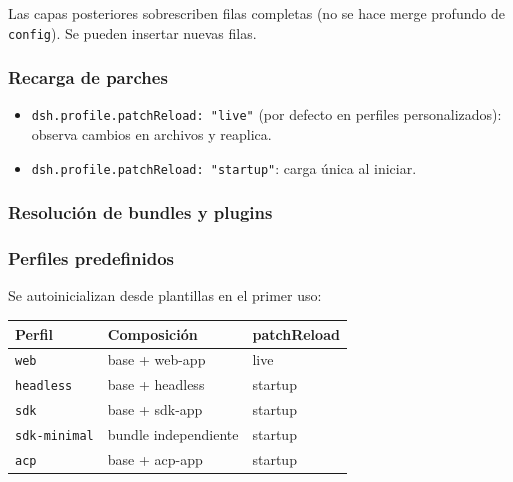 \documentclass[11pt,a4paper]{article}
\begin{document}
Las capas posteriores sobrescriben filas completas (no se hace merge profundo de \texttt{config}). Se pueden insertar nuevas filas.


\subsubsection*{Recarga de parches}


\begin{itemize}[leftmargin=*,topsep=2pt,itemsep=1pt]
  \item \texttt{dsh.profile.patchReload: "live"} (por defecto en perfiles personalizados): observa cambios en archivos y reaplica.
  \item \texttt{dsh.profile.patchReload: "startup"}: carga única al iniciar.
\end{itemize}


\subsubsection*{Resolución de bundles y plugins}




\subsubsection*{Perfiles predefinidos}


Se autoinicializan desde plantillas en el primer uso:


\begin{center}
\begin{tabular}{@{}lll@{}}
\toprule
Perfil & Composición & patchReload \\
\midrule
\texttt{web} & base + web-app & live \\
\texttt{headless} & base + headless & startup \\
\texttt{sdk} & base + sdk-app & startup \\
\texttt{sdk-minimal} & bundle independiente & startup \\
\texttt{acp} & base + acp-app & startup \\
\bottomrule
\end{tabular}
\end{center}
\end{document}
